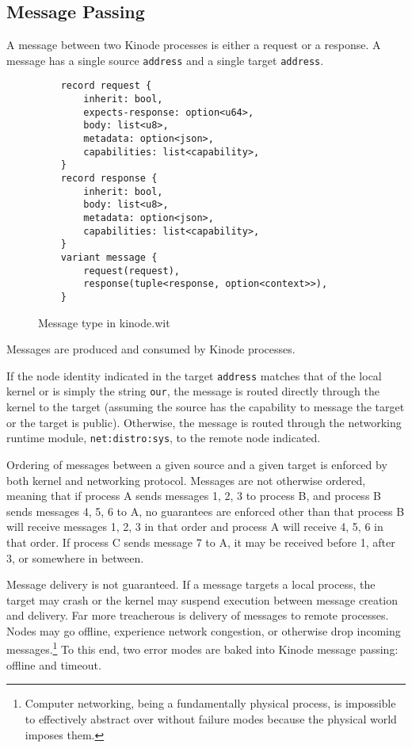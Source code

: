 \documentclass[runningheads]{llncs}
\begin{document}
\subsection{Message Passing}
\label{sec:osmessagepassing}

A message between two Kinode processes is either a request or a response.
A message has a single source \verb|address| and a single target \verb|address|.

\begin{figure}[H]
    \centering
    \begin{verbatim}
    record request {
        inherit: bool,
        expects-response: option<u64>,
        body: list<u8>,
        metadata: option<json>,
        capabilities: list<capability>,
    }
    record response {
        inherit: bool,
        body: list<u8>,
        metadata: option<json>,
        capabilities: list<capability>,
    }
    variant message {
        request(request),
        response(tuple<response, option<context>>),
    }
    \end{verbatim}
    \caption{Message type in kinode.wit}
    \label{fig:WIT Types 2}
\end{figure}

Messages are produced and consumed by Kinode processes.

If the node identity indicated in the target \verb|address| matches that of the local kernel or is simply the string \verb|our|, the message is routed directly through the kernel to the target (assuming the source has the capability to message the target or the target is public).
Otherwise, the message is routed through the networking runtime module, \verb|net:distro:sys|, to the remote node indicated.

Ordering of messages between a given source and a given target is enforced by both kernel and networking protocol.
Messages are not otherwise ordered, meaning that if process A sends messages 1, 2, 3 to process B, and process B sends messages 4, 5, 6 to A, no guarantees are enforced other than that process B will receive messages 1, 2, 3 in that order and process A will receive 4, 5, 6 in that order.
If process C sends message 7 to A, it may be received before 1, after 3, or somewhere in between.

Message delivery is not guaranteed.
If a message targets a local process, the target may crash or the kernel may suspend execution between message creation and delivery.
Far more treacherous is delivery of messages to remote processes.
Nodes may go offline, experience network congestion, or otherwise drop incoming messages.\footnote{Computer networking, being a fundamentally physical process, is impossible to effectively abstract over without failure modes because the physical world imposes them.}
To this end, two error modes are baked into Kinode message passing: offline and timeout.
\end{document}

